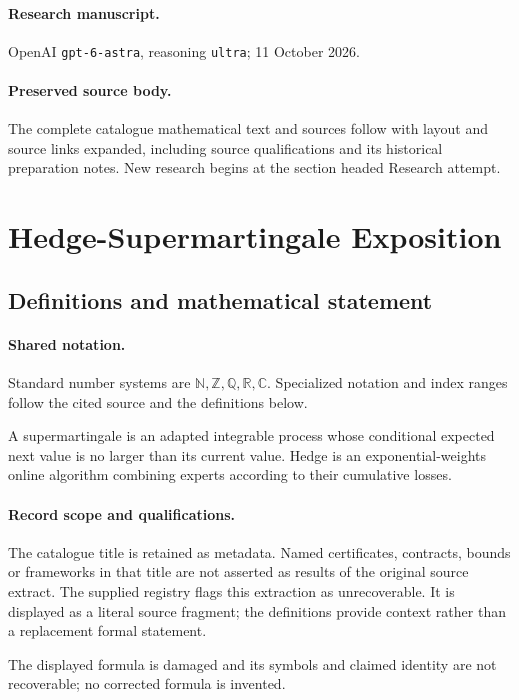 \documentclass[11pt]{article}
\begin{document}
\paragraph{Research manuscript.} OpenAI \texttt{gpt-6-astra}, reasoning \texttt{ultra}; 11 October 2026.
\paragraph{Preserved source body.} The complete catalogue mathematical text and sources follow with layout and source links expanded, including source qualifications and its historical preparation notes. New research begins at the section headed Research attempt.

\section{Hedge-Supermartingale Exposition}\label{statement}

\subsection{Definitions and mathematical statement}

\paragraph{Shared notation.}Standard number systems are $\mathbb N,\mathbb Z,\mathbb Q,\mathbb R,\mathbb C$. Specialized notation and index ranges follow the cited source and the definitions below.


A supermartingale is an adapted integrable process whose conditional expected next value is no larger than its current value. Hedge is an exponential-weights online algorithm combining experts according to their cumulative losses.
\paragraph{Record scope and qualifications.}
The catalogue title is retained as metadata. Named certificates, contracts, bounds or frameworks in that title are not asserted as results of the original source extract.
The supplied registry flags this extraction as unrecoverable. It is displayed as a literal source fragment; the definitions provide context rather than a replacement formal statement.

The displayed formula is damaged and its symbols and claimed identity are not recoverable; no corrected formula is invented.
\end{document}

